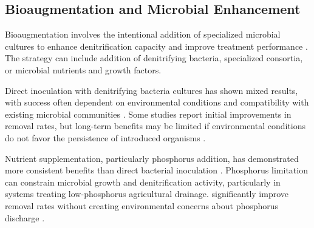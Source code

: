 \documentclass[12pt,a4paper]{article}
\begin{document}
\subsection{Bioaugmentation and Microbial Enhancement}

Bioaugmentation involves the intentional addition of specialized microbial cultures to enhance denitrification capacity and improve treatment performance \citep{RN624, RN350}.  The strategy can include addition of denitrifying bacteria, specialized consortia, or microbial nutrients and growth factors.

Direct inoculation with denitrifying bacteria cultures has shown mixed results, with success often dependent on environmental conditions and compatibility with existing microbial communities \citep{RN350}.  Some studies report initial improvements in removal rates, but long-term benefits may be limited if environmental conditions do not favor the persistence of introduced organisms \citep{RN350}.


Nutrient supplementation, particularly phosphorus addition, has demonstrated more consistent benefits than direct bacterial inoculation \citep{RN611}. Phosphorus limitation can constrain microbial growth and denitrification activity, particularly in systems treating low-phosphorus agricultural drainage.  significantly improve removal rates without creating environmental concerns about phosphorus discharge \citep{RN611}.
\end{document}
